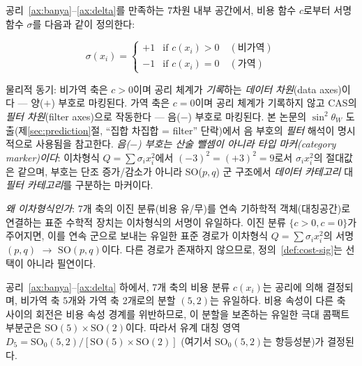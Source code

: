 \documentclass[entropy,article,submit,pdftex,oneauthor]{Definitions/mdpi}
\begin{document}
\begin{Definition}[비용--서명 사상]\label{def:cost-sig}
공리~\ref{ax:banya}--\ref{ax:delta}를 만족하는 7차원 내부 공간에서, 비용 함수 $c$로부터 서명 함수 $\sigma$를 다음과 같이 정의한다:
\begin{linenomath}
\begin{equation}
\sigma(x_i) = \begin{cases} +1 & \text{if } c(x_i) > 0 \quad (\text{비가역}) \\ -1 & \text{if } c(x_i) = 0 \quad (\text{가역}) \end{cases}
\label{eq:cost-sig}
\end{equation}
\end{linenomath}
물리적 동기: 비가역 축은 $c > 0$이며 공리 체계가 \emph{기록}하는 \emph{데이터 차원}(data axes)이다 --- 양($+$) 부호로 마킹된다. 가역 축은 $c = 0$이며 공리 체계가 기록하지 않고 CAS의 \emph{필터 차원}(filter axes)으로 작동한다 --- 음($-$) 부호로 마킹된다. 본 논문의 $\sin^2\theta_W$ 도출(제\ref{sec:prediction}절, ``집합 차집합 = filter'' 단락)에서 음 부호의 \emph{필터} 해석이 명시적으로 사용됨을 참고한다. \emph{음($-$) 부호는 산술 뺄셈이 아니라 \emph{타입 마커}(category marker)이다}: 이차형식 $Q = \sum \sigma_i x_i^2$에서 $(-3)^2 = (+3)^2 = 9$로서 $\sigma_i x_i^2$의 절대값은 같으며, 부호는 단조 증가/감소가 아니라 SO($p,q$) 군 구조에서 \emph{데이터 카테고리} 대 \emph{필터 카테고리}를 구분하는 마커이다.
\end{Definition}

\emph{왜 이차형식인가}: 7개 축의 이진 분류(비용 유/무)를 연속 기하학적 객체(대칭공간)로 연결하는 표준 수학적 장치는 이차형식의 서명이 유일하다. 이진 분류 $\{c > 0, c = 0\}$가 주어지면, 이를 연속 군으로 보내는 유일한 표준 경로가 이차형식 $Q = \sum \sigma_i x_i^2$의 서명 $(p,q)$ $\to$ $\mathrm{SO}(p,q)$이다. 다른 경로가 존재하지 않으므로, 정의~\ref{def:cost-sig}는 선택이 아니라 필연이다.

\begin{Theorem}\label{thm:cost-signature}
공리~\ref{ax:banya}--\ref{ax:delta} 하에서, 7개 축의 비용 분류 $c(x_i)$는 공리에 의해 결정되며, 비가역 축 5개와 가역 축 2개로의 분할 $(5,2)$는 유일하다. 비용 속성이 다른 축 사이의 회전은 비용 속성 경계를 위반하므로, 이 분할을 보존하는 유일한 극대 콤팩트 부분군은 $\mathrm{SO}(5) \times \mathrm{SO}(2)$이다. 따라서 유계 대칭 영역 $D_5 = \mathrm{SO}_0(5,2)/[\mathrm{SO}(5) \times \mathrm{SO}(2)]$ (여기서 $\mathrm{SO}_0(5,2)$는 항등성분)가 결정된다.
\end{Theorem}
\end{document}
